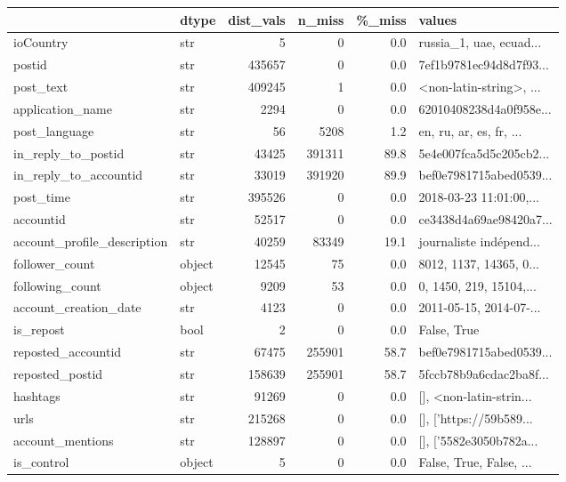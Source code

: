 \begin{tabular}{llrrrl}
\toprule
 & dtype & dist\_vals & n\_miss & \%\_miss & values \\
\midrule
ioCountry & str & 5 & 0 & 0.0 & russia\_1, uae, ecuad... \\
postid & str & 435657 & 0 & 0.0 & 7ef1b9781ec94d8d7f93... \\
post\_text & str & 409245 & 1 & 0.0 & <non-latin-string>, ... \\
application\_name & str & 2294 & 0 & 0.0 & 62010408238d4a0f958e... \\
post\_language & str & 56 & 5208 & 1.2 & en, ru, ar, es, fr, ... \\
in\_reply\_to\_postid & str & 43425 & 391311 & 89.8 & 5e4e007fca5d5c205cb2... \\
in\_reply\_to\_accountid & str & 33019 & 391920 & 89.9 & bef0e7981715abed0539... \\
post\_time & str & 395526 & 0 & 0.0 & 2018-03-23 11:01:00,... \\
accountid & str & 52517 & 0 & 0.0 & ce3438d4a69ae98420a7... \\
account\_profile\_description & str & 40259 & 83349 & 19.1 & journaliste indépend... \\
follower\_count & object & 12545 & 75 & 0.0 & 8012, 1137, 14365, 0... \\
following\_count & object & 9209 & 53 & 0.0 & 0, 1450, 219, 15104,... \\
account\_creation\_date & str & 4123 & 0 & 0.0 & 2011-05-15, 2014-07-... \\
is\_repost & bool & 2 & 0 & 0.0 & False, True \\
reposted\_accountid & str & 67475 & 255901 & 58.7 & bef0e7981715abed0539... \\
reposted\_postid & str & 158639 & 255901 & 58.7 & 5fccb78b9a6cdac2ba8f... \\
hashtags & str & 91269 & 0 & 0.0 & [], <non-latin-strin... \\
urls & str & 215268 & 0 & 0.0 & [], ['https://59b589... \\
account\_mentions & str & 128897 & 0 & 0.0 & [], ['5582e3050b782a... \\
is\_control & object & 5 & 0 & 0.0 & False, True, False, ... \\
\bottomrule
\end{tabular}
